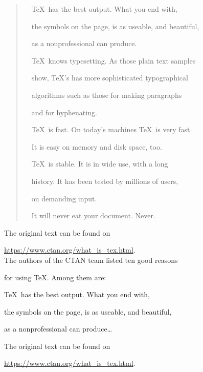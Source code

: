 \documentclass{article}
\begin{document}
\begin{quotation}

  \TeX\ has the best output. What you end with,

  the symbols on the page, is as useable, and beautiful,

  as a nonprofessional can produce.

  \TeX\ knows typesetting. As those plain text samples

  show, TeX's has more sophisticated typographical

  algorithms such as those for making paragraphs

  and for hyphenating.

  \TeX\ is fast. On today's machines \TeX\ is very fast.

  It is easy on memory and disk space, too.

  \TeX\ is stable. It is in wide use, with a long

  history. It has been tested by millions of users,

  on demanding input.

  It will never eat your document. Never.

\end{quotation}

The original text can be found on

\url{https://www.ctan.org/what_is_tex.html}.\\[10mm]


The authors of the CTAN team listed ten good reasons

for using \TeX. Among them are:

\TeX\ has the best output. What you end with,

the symbols on the page, is as useable, and beautiful,

as a nonprofessional can produce\ldots

The original text can be found on

\url{https://www.ctan.org/what_is_tex.html}.
\end{document}
